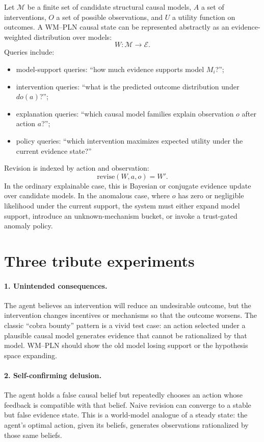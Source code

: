 \documentclass[11pt]{article}
\newcommand{\Evidence}{\ensuremath{\mathcal{E}}}
\begin{document}
Let $\mathcal{M}$ be a finite set of candidate structural causal models, $A$ a set of interventions, $O$ a set of possible observations, and $U$ a utility function on outcomes. A WM--PLN causal state can be represented abstractly as an evidence-weighted distribution over models:
\[
  W : \mathcal{M} \to \Evidence.
\]
Queries include:
\begin{itemize}
\item model-support queries: ``how much evidence supports model $M_i$?'';
\item intervention queries: ``what is the predicted outcome distribution under $do(a)$?'';
\item explanation queries: ``which causal model families explain observation $o$ after action $a$?'';
\item policy queries: ``which intervention maximizes expected utility under the current evidence state?''
\end{itemize}

Revision is indexed by action and observation:
\[
  \mathrm{revise}(W,a,o) = W'.
\]
In the ordinary explainable case, this is Bayesian or conjugate evidence update over candidate models. In the anomalous case, where $o$ has zero or negligible likelihood under the current support, the system must either expand model support, introduce an unknown-mechanism bucket, or invoke a trust-gated anomaly policy.

\section{Three tribute experiments}

\paragraph{1. Unintended consequences.}
The agent believes an intervention will reduce an undesirable outcome, but the intervention changes incentives or mechanisms so that the outcome worsens. The classic ``cobra bounty'' pattern is a vivid test case: an action selected under a plausible causal model generates evidence that cannot be rationalized by that model. WM--PLN should show the old model losing support or the hypothesis space expanding.

\paragraph{2. Self-confirming delusion.}
The agent holds a false causal belief but repeatedly chooses an action whose feedback is compatible with that belief. Naive revision can converge to a stable but false evidence state. This is a world-model analogue of a steady state: the agent's optimal action, given its beliefs, generates observations rationalized by those same beliefs.
\end{document}
